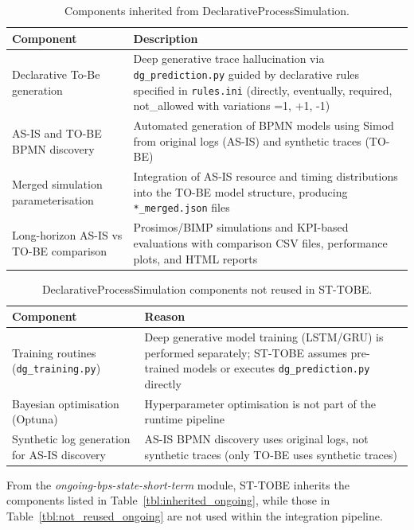 \documentclass[a4paper,fleqn]{cas-sc}
\begin{document}
\begin{table}[width=.95\linewidth,cols=2,pos=t]
\caption{Components inherited from DeclarativeProcessSimulation.}
\label{tbl:inherited_declarative}
\begin{tabular*}{\tblwidth}{@{} p{} p{} @{}}
\toprule
Component & Description \\
\midrule
Declarative To-Be generation & Deep generative trace hallucination via \verb|dg_prediction.py| guided by declarative rules specified in \verb|rules.ini| (directly, eventually, required, not\_allowed with variations =1, +1, -1) \\
AS-IS and TO-BE BPMN discovery & Automated generation of BPMN models using Simod from original logs (AS-IS) and synthetic traces (TO-BE) \\
Merged simulation parameterisation & Integration of AS-IS resource and timing distributions into the TO-BE model structure, producing \verb|*_merged.json| files \\
Long-horizon AS-IS vs TO-BE comparison & Prosimos/BIMP simulations and KPI-based evaluations with comparison CSV files, performance plots, and HTML reports \\
\bottomrule
\end{tabular*}
\end{table}

\begin{table}[width=.95\linewidth,cols=2,pos=t]
\caption{DeclarativeProcessSimulation components not reused in ST-TOBE.}
\label{tbl:not_reused_declarative}
\begin{tabular*}{\tblwidth}{@{} p{} p{} @{}}
\toprule
Component & Reason \\
\midrule
Training routines (\verb|dg_training.py|) & Deep generative model training (LSTM/GRU) is performed separately; ST-TOBE assumes pre-trained models or executes \verb|dg_prediction.py| directly \\
Bayesian optimisation (Optuna) & Hyperparameter optimisation is not part of the runtime pipeline \\
Synthetic log generation for AS-IS discovery & AS-IS BPMN discovery uses original logs, not synthetic traces (only TO-BE uses synthetic traces) \\
\bottomrule
\end{tabular*}
\end{table}

From the \emph{ongoing-bps-state-short-term} module, ST-TOBE
inherits the components listed in Table~\ref{tbl:inherited_ongoing}, while
those in Table~\ref{tbl:not_reused_ongoing} are not used within the
integration pipeline.
\end{document}
